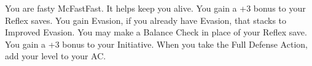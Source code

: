 {You are fasty McFastFast. It helps keep you alive.}
{You gain a +3 bonus to your Reflex saves.}
{You gain Evasion, if you already have Evasion, that stacks to Improved Evasion.}
{You may make a Balance Check in place of your Reflex save.}
{You gain a +3 bonus to your Initiative.}
{When you take the Full Defense Action, add your level to your AC.}